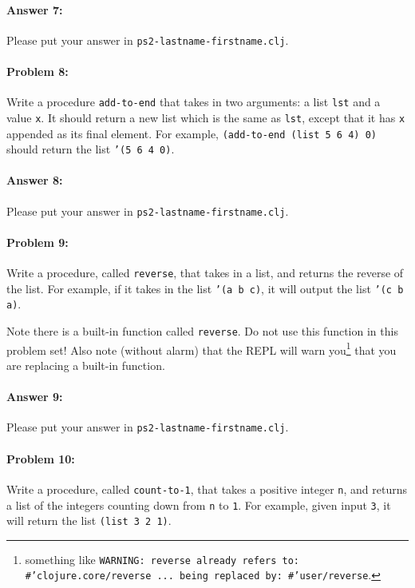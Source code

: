 \documentclass[10pt]{article}
\newcommand{\PSnum}{2}
\begin{document}
\paragraph{Answer 7:} Please put your answer in \texttt{ps\PSnum-lastname-firstname.clj}.

\noindent\hrulefill %

\paragraph{Problem 8:}
  Write a procedure \texttt{add-to-end} that takes in two arguments: a
  list \texttt{lst} and a value \texttt{x}. It should return a new list
  which is the same as \texttt{lst}, except that it has \texttt{x} appended as
  its final element. For example, \texttt{(add-to-end (list 5 6 4) 0)}
  should return the list \texttt{'(5 6 4 0)}.

\paragraph{Answer 8:} Please put your answer in \texttt{ps\PSnum-lastname-firstname.clj}.

\noindent\hrulefill %

\paragraph{Problem 9:}
  Write a procedure, called \texttt{reverse}, that takes in a list, and returns
  the reverse of the list. For example, if it takes in the list \texttt{'(a b c)}, it will output the list \texttt{'(c b a)}.

  Note there is a built-in function called \texttt{reverse}.  Do not use this function in this problem set!  Also note (without alarm) that the REPL will warn you\footnote{something like \texttt{WARNING: reverse already refers to: #'clojure.core/reverse ... being replaced by: #'user/reverse}.} that you are replacing a built-in function.

\paragraph{Answer 9:} Please put your answer in \texttt{ps\PSnum-lastname-firstname.clj}.

\noindent\hrulefill %

\paragraph{Problem 10:}
  Write a procedure, called \texttt{count-to-1}, that takes a positive
  integer \texttt{n}, and returns a list of the integers counting down
  from \texttt{n} to \texttt{1}. For example, given input \texttt{3},
  it will return the list \texttt{(list 3 2 1)}.
\end{document}
